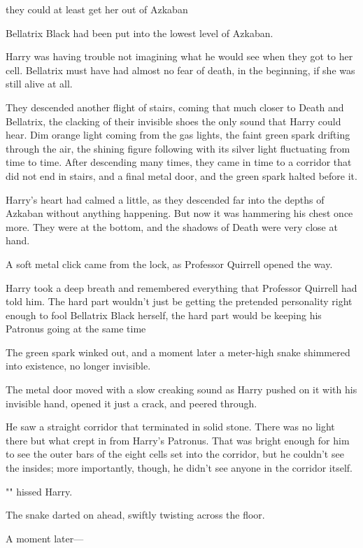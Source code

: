 {\el} they could at least get her out of Azkaban{\el}

Bellatrix Black had been put into the lowest level of Azkaban.

Harry was having trouble not imagining what he would see when they got to her
cell. Bellatrix must have had almost no fear of death, in the beginning, if she
was still alive at all.

They descended another flight of stairs, coming that much closer to Death and
Bellatrix, the clacking of their invisible shoes the only sound that Harry
could hear. Dim orange light coming from the gas lights, the faint green spark
drifting through the air, the shining figure following with its silver light
fluctuating from time to time.
\sbreak
After descending many times, they came in time to a corridor that did not end
in stairs, and a final metal door, and the green spark halted before it.

Harry's heart had calmed a little, as they descended far into the depths of
Azkaban without anything happening. But now it was hammering his chest once
more. They were at the bottom, and the shadows of Death were very close at hand.

A soft metal click came from the lock, as Professor Quirrell opened the way.

Harry took a deep breath and remembered everything that Professor Quirrell had
told him. The hard part wouldn't just be getting the pretended personality
right enough to fool Bellatrix Black herself, the hard part would be keeping
his Patronus going at the same time{\el}

The green spark winked out, and a moment later a meter-high snake shimmered
into existence, no longer invisible.

The metal door moved with a slow creaking sound as Harry pushed on it with his
invisible hand, opened it just a crack, and peered through.

He saw a straight corridor that terminated in solid stone. There was no light
there but what crept in from Harry's Patronus. That was bright enough for him
to see the outer bars of the eight cells set into the corridor, but he couldn't
see the insides; more importantly, though, he didn't see anyone in the corridor
itself.

"" hissed Harry.

The snake darted on ahead, swiftly twisting across the floor.

A moment later—

